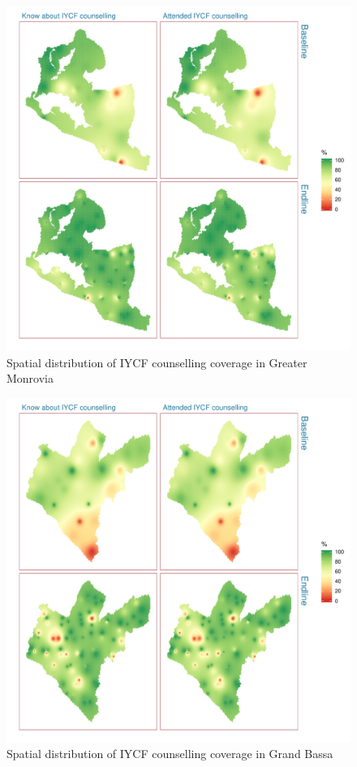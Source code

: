 \documentclass[12pt,a4paper]{article}
\begin{document}
\begin{figure}[H]

{\centering \includegraphics{liberiaCoverageFinalReport_files/figure-latex/icf1map-1} 

}

\caption{Spatial distribution of IYCF counselling coverage in Greater Monrovia}\label{fig:icf1map}
\end{figure}

\begin{figure}[H]

{\centering \includegraphics{liberiaCoverageFinalReport_files/figure-latex/icf2map-1} 

}

\caption{Spatial distribution of IYCF counselling coverage in Grand Bassa}\label{fig:icf2map}
\end{figure}
\end{document}
